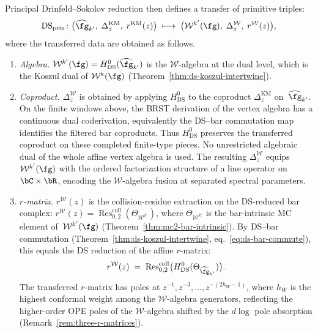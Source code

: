 \begin{proposition}
Principal Drinfeld--Sokolov reduction then defines a transfer of
primitive triples:
\begin{equation}\label{eq:ds-functor-primitive-triple}
 \mathrm{DS}_{\mathrm{prin}} \colon
 \bigl(\widehat{\fg}_{k'},\;
 \Delta_z^{\mathrm{KM}},\;
 r^{\mathrm{KM}}(z)\bigr)
 \;\longmapsto\;
 \bigl(\mathcal{W}^{k'}(\fg),\;
 \Delta_z^{\mathcal{W}},\;
 r^{\mathcal{W}}(z)\bigr),
\end{equation}
where the transferred data are obtained as follows.
\begin{enumerate}[label=\textup{(\roman*)}]
\item \emph{Algebra.}
 $\mathcal{W}^{k'}(\fg)
 = H^0_{\mathrm{DS}}(\widehat{\fg}_{k'})$
 is the $\mathcal{W}$-algebra at the dual level,
 which is the Koszul dual of
 $\mathcal{W}^k(\fg)$
 \textup{(}Theorem~\textup{\ref{thm:ds-koszul-intertwine}}\textup{)}.
\item \emph{Coproduct.}
 $\Delta_z^{\mathcal{W}}$ is obtained by applying
 $H^0_{\mathrm{DS}}$ to the coproduct
 $\Delta_z^{\mathrm{KM}}$ on~$\widehat{\fg}_{k'}$.
 On the finite windows above, the BRST derivation of the vertex
 algebra has a continuous dual coderivation, equivalently the
 DS--bar commutation map identifies the filtered bar coproducts.
 Thus $H^0_{\mathrm{DS}}$ preserves the transferred coproduct on
 these completed finite-type pieces. No unrestricted algebraic dual
 of the whole affine vertex algebra is used.
 The resulting $\Delta_z^{\mathcal{W}}$ equips
 $\mathcal{W}^{k'}(\fg)$ with the ordered
 factorization structure of a line operator on
 $\bC \times \bR$, encoding the $\mathcal{W}$-algebra
 fusion at separated spectral parameters.
\item \emph{$r$-matrix.}
 $r^{\mathcal{W}}(z)$ is the collision-residue extraction
 on the DS-reduced bar complex:
 $r^{\mathcal{W}}(z) =
 \operatorname{Res}^{\mathrm{coll}}_{0,2}(\Theta_{\mathcal{W}^{k'}})$,
 where $\Theta_{\mathcal{W}^{k'}}$ is the bar-intrinsic
 MC element of~$\mathcal{W}^{k'}(\fg)$
 \textup{(}Theorem~\textup{\ref{thm:mc2-bar-intrinsic}}\textup{)}.
 By DS--bar commutation
 \textup{(}Theorem~\textup{\ref{thm:ds-koszul-intertwine}},
 eq.~\eqref{eq:ds-bar-commute}\textup{)},
 this equals the DS reduction of the affine $r$-matrix:
 \begin{equation}\label{eq:ds-r-transfer}
 r^{\mathcal{W}}(z)
 \;=\;
 \operatorname{Res}^{\mathrm{coll}}_{0,2}
 \bigl(
 H^0_{\mathrm{DS}}(\Theta_{\widehat{\fg}_{k'}})
 \bigr).
 \end{equation}
 The transferred $r$-matrix has poles at $z^{-1}, z^{-3},
 \ldots, z^{-(2h_W-1)}$, where $h_W$ is the highest
 conformal weight among the $\mathcal{W}$-algebra generators,
 reflecting the higher-order OPE poles of the
 $\mathcal{W}$-algebra shifted by the
 $d\log$ pole absorption
 \textup{(}Remark~\textup{\ref{rem:three-r-matrices}}\textup{)}.
\end{enumerate}
\end{proposition}

